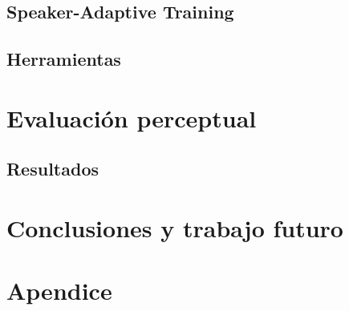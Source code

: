 \documentclass[11pt,a4paper,twoside]{tesis}
\begin{document}
\section{Speaker-Adaptive Training}\label{speakerAdaptativeTraining}


\section{Herramientas} \label{herramientas}

\pagebreak
\chapter{Evaluación perceptual}\label{evaluacionPerceptual}

\pagebreak

\section{Resultados}

\pagebreak

\chapter{Conclusiones y trabajo futuro}

\pagebreak
\chapter{Apendice}


\backmatter
%
\end{document}
